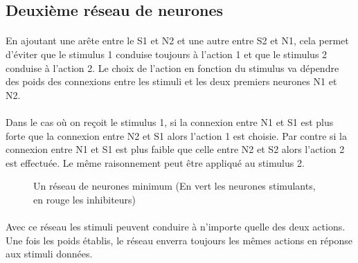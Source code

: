 \subsection{Deuxième réseau de neurones}
\paragraph{}
En ajoutant une arête entre le S1 et N2 et une autre entre S2 et N1, cela
permet d'éviter que le stimulus 1 conduise toujours à l'action 1 et que le
stimulus 2 conduise à l'action 2. Le choix de l'action en fonction du stimulus
va dépendre des poids des connexions entre les stimuli et les deux premiers
neurones N1 et N2.

\paragraph{}
Dans le cas où on reçoit le stimulus 1, si la connexion entre N1 et S1 est
plus forte que la connexion entre N2 et S1 alors l'action 1 est choisie.
Par contre si la connexion entre N1 et S1 est plus faible que celle entre
N2 et S2 alors l'action 2 est effectuée. Le même raisonnement peut être
appliqué au stimulus 2.

\begin{figure}[!h]
  \begin{center}
    
  \end{center}
  \caption{Un réseau de neurones minimum (En vert les neurones stimulants, en rouge les inhibiteurs)}
  \label{reseau2}
\end{figure}

\paragraph{}
Avec ce réseau les stimuli peuvent conduire à n'importe quelle des deux
actions. Une fois les poids établis, le réseau enverra toujours les mêmes
actions en réponse aux stimuli données.
